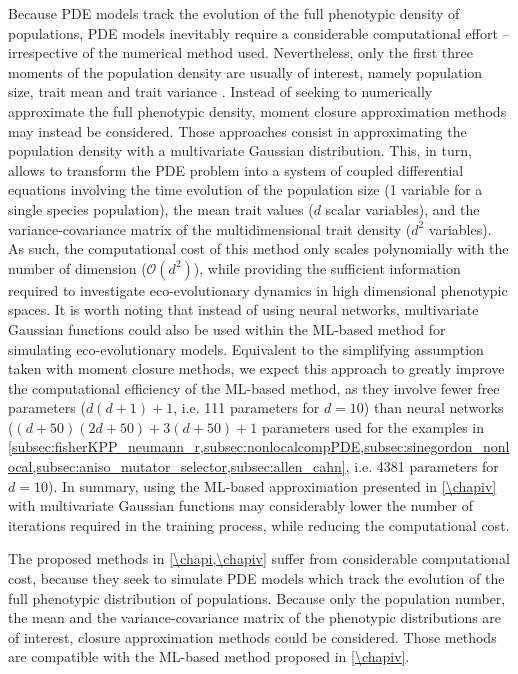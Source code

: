Because PDE models track the evolution of the full phenotypic density of populations, PDE models inevitably require a considerable computational effort -- irrespective of the numerical method used. 
% 
Nevertheless, only the first three moments of the population density are usually of interest, namely population size, trait mean and trait variance \citep{Nordbotten2020}. 
% 
Instead of seeking to numerically approximate the full phenotypic density, moment closure approximation methods \citep{Wickman2021,Lion2022,Nordbotten2020} may instead be considered. Those approaches consist in approximating the population density with a multivariate Gaussian distribution. This, in turn, allows to transform the PDE problem into a system of coupled differential equations involving the time evolution of the population size (1 variable for a single species population), the mean trait values ($d$ scalar variables), and the variance-covariance matrix of the multidimensional trait density ($d^2$ variables). As such, the computational cost of this method only scales polynomially with the number of dimension ($\mathcal{O}(d^2)$), while providing the sufficient information required to investigate eco-evolutionary dynamics in high dimensional phenotypic spaces. 
% 
It is worth noting that instead of using neural networks, multivariate Gaussian functions could also be used within the ML-based method for simulating eco-evolutionary models. Equivalent to the simplifying assumption taken with moment closure methods, we expect this approach to greatly improve the computational efficiency of the ML-based method, as they involve fewer free parameters ($d(d+1) + 1$, i.e. 111 parameters for $d=10$) than neural networks ($(d+50)(2d+50) + 3(d+50) + 1$ parameters used for the examples in \cref{subsec:fisherKPP_neumann_r,subsec:nonlocalcompPDE,subsec:sinegordon_nonlocal,subsec:aniso_mutator_selector,subsec:allen_cahn}, i.e. 4381 parameters for $d=10$).
In summary, using the ML-based approximation presented in \cref{\chapiv} with multivariate Gaussian functions may considerably lower the number of iterations required in the training process, while reducing the computational cost.

The proposed methods in \cref{\chapi,\chapiv} suffer from considerable computational cost, because they seek to simulate PDE models which track the evolution of the full phenotypic distribution of populations. Because only the population number, the mean and the variance-covariance matrix of the phenotypic distributions are of interest, closure approximation methods could be considered. Those methods are compatible with the ML-based method proposed in \cref{\chapiv}.


